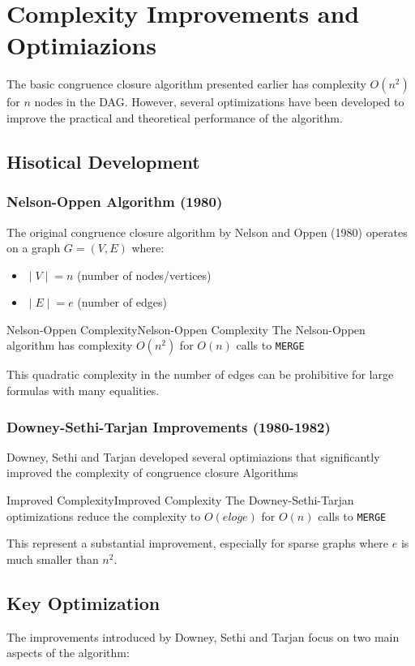 \documentclass[a4paper]{article}
\theoremstyle{definition}
\begin{document}
\section{Complexity Improvements and Optimiazions}
The basic congruence closure algorithm presented earlier has complexity \( O(n^2) \) for \( n \) nodes in 
the DAG. However, several optimizations have been developed to improve the practical and theoretical performance 
of the algorithm.
\subsection{Hisotical Development}
\subsubsection{Nelson-Oppen Algorithm (1980)}
The original congruence closure algorithm by Nelson and Oppen (1980) operates on a graph \( G = (V,E) \) where:
\begin{itemize}
	\item \( \;|\; V \;|\; = n \) (number of nodes/vertices)
	\item \( \;|\; E \;|\; = e \) (number of edges)
\end{itemize}
\begin{definition}{Nelson-Oppen Complexity}{Nelson-Oppen Complexity}
The Nelson-Oppen algorithm has complexity \( O(n^2) \) for \( O(n) \) calls to \texttt{MERGE}
\end{definition}
This quadratic complexity in the number of edges can be prohibitive for large formulas with many equalities.
\subsubsection{Downey-Sethi-Tarjan Improvements (1980-1982)}
Downey, Sethi and Tarjan developed several optimiazions that significantly improved the complexity of congruence 
closure Algorithms
\begin{definition}{Improved Complexity}{Improved Complexity}
The Downey-Sethi-Tarjan optimizations reduce the complexity to \( O(e log e) \) for \( O(n) \) calls to \texttt{MERGE}
\end{definition}
This represent a substantial improvement, especially for sparse graphs where \( e \) is much smaller than \( n^2 \).
\subsection{Key Optimization}
The improvements introduced by Downey, Sethi and Tarjan focus on two main aspects of the algorithm:
\end{document}
